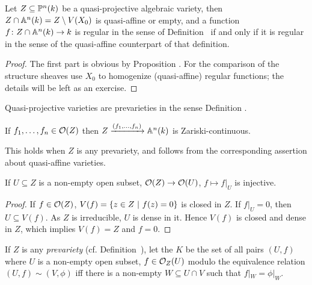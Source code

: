 \documentclass[a4paper,parskip=half,numbers=enddot, DIV=12]{scrreprt}
\begin{document}
\begin{prop}
    Let $Z\subseteq \mathbb{P}^n(k)$ be a quasi-projective algebraic variety, then $Z\cap \mathbb{A}^n(k) = Z \setminus V(X_0)$ is quasi-affine or empty, and a function $f\colon Z\cap \IA^n(k)\morphism k$ is regular in the sense of Definition~ if and only if it is regular in the sense of the quasi-affine counterpart of that definition. 
\end{prop}
\begin{proof}
    The first part is obvious by Proposition . For the comparison of the structure sheaves use $X_0$ to homogenize (quasi-affine) regular functions; the details will be left as an exercise.
\end{proof}
\begin{cor*}
    Quasi-projective varieties are prevarieties in the sense Definition .
\end{cor*}
\begin{cor}
    If $f_1,\ldots, f_n\in \mathcal{O}(Z)$ then $Z\xrightarrow{(f_1,\ldots, f_n)}\mathbb{A}^n(k)$ is Zariski-continuous.
\end{cor}
\begin{rem*}
    This holds when $Z$ is any prevariety, and follows from the corresponding assertion about quasi-affine varieties.
\end{rem*}
\begin{cor}
    If $U\subseteq Z$ is a non-empty open subset, $\Oo(Z)\morphism \Oo(U)$, $f\mapsto f|_U$ is injective.
\end{cor}
\begin{proof}
    If $f\in \mathcal{O}(Z)$, $V(f) = \left\{z\in Z\ \middle|\  f(z)=0\right\}$ is closed in $Z$. If $f|_U=0$, then $U\subseteq V(f)$. As $Z$ is irreducible, $U$ is dense in it. Hence $V(f)$ is closed and dense in $Z$, which implies $V(f)=Z$ and $f=0$.
\end{proof}
\begin{defi}
    If $Z$ is any \emph{prevariety} (cf. Definition~), let the  $K$ be the set of all pairs $(U,f)$ where $U$ is a non-empty open subset, $f\in\mathcal{O}_Z(U)$ modulo the equivalence relation $(U,f)\sim (V,\phi)$ iff there is a non-empty $W\subseteq U\cap V$ such that $f|_W= \phi|_W$.
\end{defi}
\end{document}
